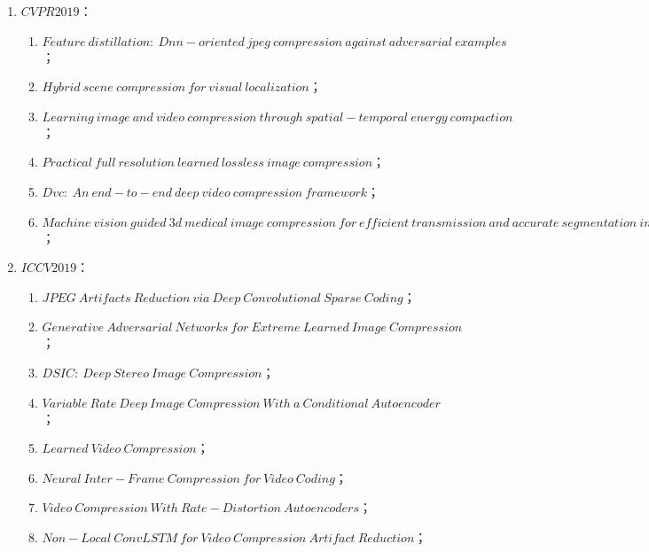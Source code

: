 \documentclass[UTF8]{ctexart}
\begin{document}
    			\begin{enumerate}[leftmargin=50pt]
    				\item $CVPR2019$：
            			\begin{enumerate}[leftmargin=20pt]
            				\item $Feature\ distillation:\ Dnn-oriented\ jpeg\ compression\ against\ adversarial\ examples$\cite{liu2019feature}；
            				\item $Hybrid\ scene\ compression\ for\ visual\ localization$\cite{camposeco2019hybrid}；
            				\item $Learning\ image\ and\ video\ compression\ through\ spatial-temporal\ energy\ compaction$\cite{cheng2019learning}；
                            \item $Practical\ full\ resolution\ learned\ lossless\ image\ compression$\cite{mentzer2019practical}；
                            \item $Dvc:\ An\ end-to-end\ deep\ video\ compression\ framework$\cite{lu2019dvc}；
                            \item $Machine\ vision\ guided\ 3d\ medical\ image\ compression\ for\ efficient\ transmission\ and\ accurate\ segmentation\ in\ the\ clouds$\cite{liu2019machine}；
            			\end{enumerate}
                    \item $ICCV2019$：
           			\begin{enumerate}[leftmargin=20pt]
            				\item $JPEG\ Artifacts\ Reduction\ via\ Deep\ Convolutional\ Sparse\ Coding$\cite{Fu_2019_ICCV}；
            				\item $Generative\ Adversarial\ Networks\ for\ Extreme\ Learned\ Image\ Compression$\cite{Agustsson_2019_ICCV}；
            				\item $DSIC:\ Deep\ Stereo\ Image\ Compression$\cite{Liu_2019_ICCV}；
                            \item $Variable\ Rate\ Deep\ Image\ Compression\ With\ a\ Conditional\ Autoencoder$\cite{Choi_2019_ICCV}；
                            \item $Learned\ Video\ Compression$\cite{Rippel_2019_ICCV}；
                            \item $Neural\ Inter-Frame\ Compression\ for\ Video\ Coding$\cite{Djelouah_2019_ICCV}；
                            \item $Video\ Compression\ With\ Rate-Distortion\ Autoencoders$\cite{Habibian_2019_ICCV}；
                            \item $Non-Local\ ConvLSTM\ for\ Video\ Compression\ Artifact\ Reduction$\cite{Xu_2019_ICCV}；
            			\end{enumerate}                    
    			\end{enumerate}        
        
\end{document}
